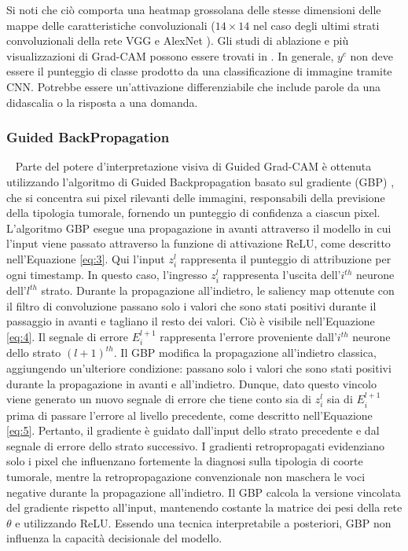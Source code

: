 Si noti che ciò comporta una heatmap grossolana delle stesse dimensioni delle mappe delle caratteristiche 
convoluzionali ($14 \times 14$  nel caso degli ultimi strati convoluzionali della rete VGG \cite{simonyan2014very} 
e AlexNet \cite{krizhevsky2017imagenet}). 
Gli studi di ablazione e più visualizzazioni di Grad-CAM possono essere trovati in \cite{selvaraju2016grad}. 
In generale, $y^{c}$ non deve essere il punteggio di classe prodotto da una classificazione di immagine tramite CNN.
Potrebbe essere un'attivazione differenziabile che include parole da una didascalia o la risposta a una domanda.

\subsubsection{Guided BackPropagation}~\newline
Parte del potere d'interpretazione visiva di Guided Grad-CAM è ottenuta utilizzando l'algoritmo di Guided
Backpropagation basato sul gradiente (GBP) \cite{springenberg2014striving}, che si concentra sui pixel rilevanti 
delle immagini, responsabili della previsione della tipologia tumorale, fornendo un punteggio di confidenza a 
ciascun pixel. L'algoritmo GBP esegue una propagazione in avanti attraverso il modello in cui l'input viene passato
attraverso la funzione di attivazione ReLU, come descritto nell'Equazione \ref{eq:3}. Qui l'input $z_{i}^{l}$
rappresenta il punteggio di attribuzione per ogni timestamp. In questo caso, l'ingresso $z_{i}^{l}$ rappresenta 
l'uscita dell'$i^{th}$ neurone dell'$l^{th}$ strato. Durante la propagazione all'indietro, le saliency map ottenute 
con il filtro di convoluzione passano solo i valori che sono stati positivi durante il passaggio in avanti e
tagliano il resto dei valori. Ciò è visibile nell'Equazione \ref{eq:4}. Il segnale di errore $E_{i}^{l+1}$ 
rappresenta l'errore proveniente dall'$i^{th}$ neurone dello strato $(l+1)^{th}$. Il GBP modifica la propagazione
all'indietro classica, aggiungendo un'ulteriore condizione: passano solo i valori che sono stati positivi durante 
la propagazione in avanti e all'indietro. Dunque, dato questo vincolo viene generato un nuovo segnale di errore che 
tiene conto sia di $z_{i}^{l}$ sia di $E_{i}^{l+1}$ prima di passare l'errore al livello precedente, come descritto
nell'Equazione \ref{eq:5}. Pertanto, il gradiente è guidato dall'input dello strato precedente e dal segnale di 
errore dello strato successivo. I gradienti retropropagati evidenziano solo i pixel che influenzano fortemente la
diagnosi sulla tipologia di coorte tumorale, mentre la retropropagazione convenzionale non maschera le voci
negative durante la propagazione all'indietro. Il GBP calcola la versione vincolata del gradiente rispetto all'input,
mantenendo costante la matrice dei pesi della rete $\theta$ e utilizzando ReLU. Essendo una tecnica interpretabile a
posteriori, GBP non influenza la capacità decisionale del modello.

